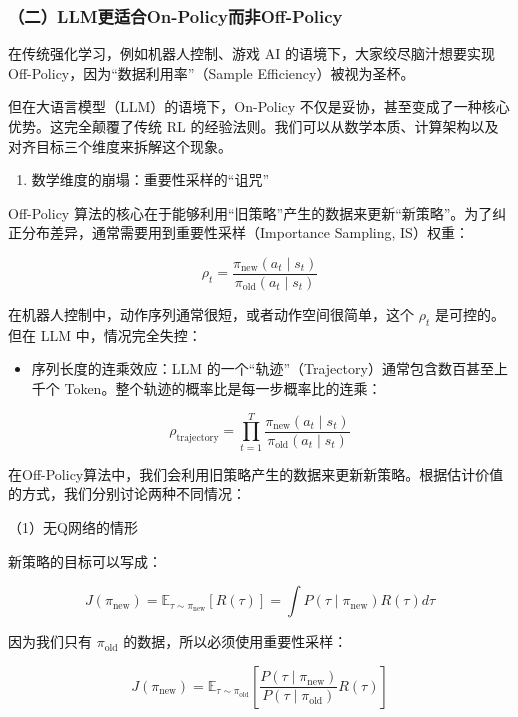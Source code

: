 \hypertarget{ux4e8cllmux66f4ux9002ux5408on-policyux800cux975eoff-policy}{%
\subsubsection{（二）LLM更适合On-Policy而非Off-Policy}\label{ux4e8cllmux66f4ux9002ux5408on-policyux800cux975eoff-policy}}

在传统强化学习，例如机器人控制、游戏 AI 的语境下，大家绞尽脑汁想要实现 Off-Policy，因为``数据利用率''（Sample Efficiency）被视为圣杯。

但在大语言模型（LLM）的语境下，On-Policy 不仅是妥协，甚至变成了一种核心优势。这完全颠覆了传统 RL 的经验法则。我们可以从数学本质、计算架构以及对齐目标三个维度来拆解这个现象。

\begin{enumerate}
\def\labelenumi{\arabic{enumi}.}
\tightlist
\item
  数学维度的崩塌：重要性采样的``诅咒''
\end{enumerate}

Off-Policy 算法的核心在于能够利用``旧策略''产生的数据来更新``新策略''。为了纠正分布差异，通常需要用到重要性采样（Importance Sampling, IS）权重：

\[
\rho_t
=
\frac{\pi_{\mathrm{new}}(a_t \mid s_t)}
{\pi_{\mathrm{old}}(a_t \mid s_t)}
\]

在机器人控制中，动作序列通常很短，或者动作空间很简单，这个 \(\rho_t\) 是可控的。但在 LLM 中，情况完全失控：

\begin{itemize}
\tightlist
\item
  序列长度的连乘效应：LLM 的一个``轨迹''（Trajectory）通常包含数百甚至上千个 Token。整个轨迹的概率比是每一步概率比的连乘：
\end{itemize}

\[
\rho_{\mathrm{trajectory}}
=
\prod_{t=1}^{T}
\frac{\pi_{\mathrm{new}}(a_t\mid s_t)}
{\pi_{\mathrm{old}}(a_t\mid s_t)}
\]

在Off-Policy算法中，我们会利用旧策略产生的数据来更新新策略。根据估计价值的方式，我们分别讨论两种不同情况：

（1）无Q网络的情形

新策略的目标可以写成：

\[
J(\pi_{\mathrm{new}})
=
\mathbb{E}_{\tau\sim\pi_{\mathrm{new}}}[R(\tau)]
=
\int P(\tau\mid\pi_{\mathrm{new}})R(\tau)d\tau
\]

因为我们只有 \(\pi_{\mathrm{old}}\) 的数据，所以必须使用重要性采样：

\[
J(\pi_{\mathrm{new}})
=
\mathbb{E}_{\tau\sim\pi_{\mathrm{old}}}
\left[
\frac{P(\tau\mid\pi_{\mathrm{new}})}
{P(\tau\mid\pi_{\mathrm{old}})}
R(\tau)
\right]
\]

